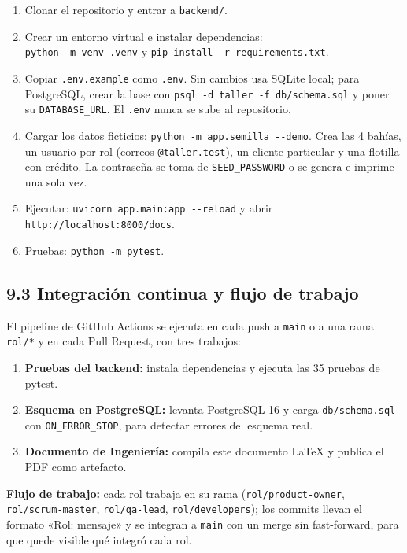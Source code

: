\begin{enumerate}
\tightlist
\item Clonar el repositorio y entrar a \texttt{backend/}.
\item Crear un entorno virtual e instalar dependencias:\\
\texttt{python -m venv .venv} y \texttt{pip install -r requirements.txt}.
\item Copiar \texttt{.env.example} como \texttt{.env}. Sin cambios usa SQLite local; para PostgreSQL,
crear la base con \texttt{psql -d taller -f db/schema.sql} y poner su \texttt{DATABASE\_URL}. El
\texttt{.env} nunca se sube al repositorio.
\item Cargar los datos ficticios: \texttt{python -m app.semilla -{}-demo}. Crea las 4 bahías, un usuario por
rol (correos \texttt{@taller.test}), un cliente particular y una flotilla con crédito. La contraseña se
toma de \texttt{SEED\_PASSWORD} o se genera e imprime una sola vez.
\item Ejecutar: \texttt{uvicorn app.main:app -{}-reload} y abrir \texttt{http://localhost:8000/docs}.
\item Pruebas: \texttt{python -m pytest}.
\end{enumerate}

\subsection{9.3 Integración continua y flujo de
trabajo}\label{integraciuxf3n-continua-y-flujo-de-trabajo}

El pipeline de GitHub Actions se ejecuta en cada push a \texttt{main} o a una rama \texttt{rol/*} y en cada
Pull Request, con tres trabajos:

\begin{enumerate}
\tightlist
\item \textbf{Pruebas del backend:} instala dependencias y ejecuta las 35 pruebas de pytest.
\item \textbf{Esquema en PostgreSQL:} levanta PostgreSQL 16 y carga \texttt{db/schema.sql} con
\texttt{ON\_ERROR\_STOP}, para detectar errores del esquema real.
\item \textbf{Documento de Ingeniería:} compila este documento LaTeX y publica el PDF como artefacto.
\end{enumerate}

\textbf{Flujo de trabajo:} cada rol trabaja en su rama (\texttt{rol/product-owner}, \texttt{rol/scrum-master},
\texttt{rol/qa-lead}, \texttt{rol/developers}); los commits llevan el formato «Rol: mensaje» y se integran
a \texttt{main} con un merge sin fast-forward, para que quede visible qué integró cada rol.

